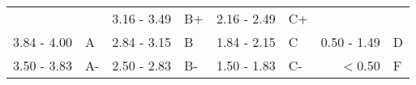 \vspace{.75\baselineskip}
\begin{center}
\begin{tabular}{*{4}{rl}}
\toprule & & 3.16 - 3.49 & B+ & 2.16 - 2.49 & C+ & & \\
3.84 - 4.00 & A & 2.84 - 3.15 & B & 1.84 - 2.15 & C & 0.50 - 1.49 & D \\
3.50 - 3.83 & A- & 2.50 - 2.83 & B- & 1.50 - 1.83 & C- & $<$0.50 & F \\ \bottomrule
\end{tabular}
\end{center}
\vspace{.5\baselineskip}